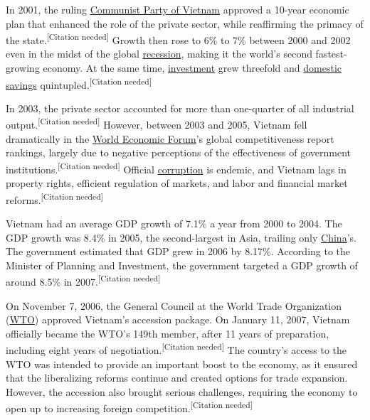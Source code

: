 \documentclass[openany]{book}
\begin{document}
In 2001, the ruling \href{https://en.wikipedia.org/wiki/Communist_Party_of_Vietnam}{Communist Party of Vietnam} approved a 10-year economic plan that enhanced the role of the private sector, while reaffirming the primacy of the state.\textsuperscript{[Citation needed]} Growth then rose to 6\% to 7\% between 2000 and 2002 even in the midst of the global \href{https://en.wikipedia.org/wiki/Recession}{recession}, making it the world's second fastest-growing economy. At the same time, \href{https://en.wikipedia.org/wiki/Investment}{investment} grew threefold and \href{https://en.wikipedia.org/wiki/Domestic_savings}{domestic savings} quintupled.\textsuperscript{[Citation needed]}

In 2003, the private sector accounted for more than one-quarter of all industrial output.\textsuperscript{[Citation needed]} However, between 2003 and 2005, Vietnam fell dramatically in the \href{https://en.wikipedia.org/wiki/World_Economic_Forum}{World Economic Forum}'s global competitiveness report rankings, largely due to negative perceptions of the effectiveness of government institutions.\textsuperscript{[Citation needed]} Official \href{https://en.wikipedia.org/wiki/Political_corruption}{corruption} is endemic, and Vietnam lags in property rights, efficient regulation of markets, and labor and financial market reforms.\textsuperscript{[Citation needed]}

Vietnam had an average GDP growth of 7.1\% a year from 2000 to 2004. The GDP growth was 8.4\% in 2005, the second-largest in Asia, trailing only \href{https://en.wikipedia.org/wiki/China}{China}'s. The government estimated that GDP grew in 2006 by 8.17\%. According to the Minister of Planning and Investment, the government targeted a GDP growth of around 8.5\% in 2007.\textsuperscript{[Citation needed]}

On November 7, 2006, the General Council at the World Trade Organization (\href{https://en.wikipedia.org/wiki/WTO}{WTO}) approved Vietnam's accession package. On January 11, 2007, Vietnam officially became the WTO's 149th member, after 11 years of preparation, including eight years of negotiation.\textsuperscript{[Citation needed]} The country's access to the WTO was intended to provide an important boost to the economy, as it ensured that the liberalizing reforms continue and created options for trade expansion. However, the accession also brought serious challenges, requiring the economy to open up to increasing foreign competition.\textsuperscript{[Citation needed]}
\end{document}
